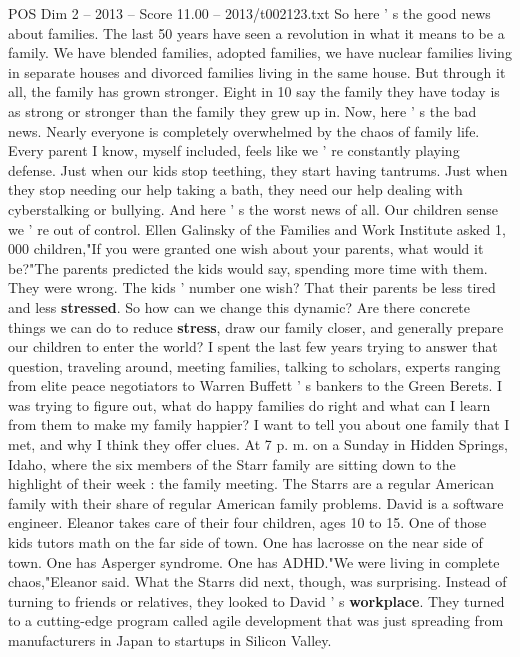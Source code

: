 \begin{textsample}{POS Dim 2 – 2013 – Score 11.00 – 2013/t002123.txt}  \label{ex:f2_pos_069}
So here ' s the good news about families.
The last 50 years have seen a revolution in what it means to be a family.
We have blended families, adopted families, we have nuclear families living in separate houses and divorced families living in the same house.
But through it all, the family has grown stronger.
Eight in 10 say the family they have today is as strong or stronger than the family they grew up in.
Now, here ' s the bad news.
Nearly everyone is completely overwhelmed by the chaos of family life.
Every parent I know, myself included, feels like we ' re constantly playing defense.
Just when our kids stop teething, they start having tantrums.
Just when they stop needing our help taking a bath, they need our help dealing with cyberstalking or bullying.
And here ' s the worst news of all.
Our children sense we ' re out of control.
Ellen Galinsky of the Families and Work Institute asked 1, 000 children,"If you were granted one wish about your parents, what would it be?"The parents predicted the kids would say, spending more time with them.
They were wrong.
The kids ' number one wish?
That their parents be less tired and less \textbf{stressed}.
So how can we change this dynamic?
Are there concrete things we can do to reduce \textbf{stress}, draw our family closer, and generally prepare our children to enter the world?
I spent the last few years trying to answer that question, traveling around, meeting families, talking to scholars, experts ranging from elite peace negotiators to Warren Buffett ' s bankers to the Green Berets.
I was trying to figure out, what do happy families do right and what can I learn from them to make my family happier?
I want to tell you about one family that I met, and why I think they offer clues.
At 7 p. m. on a Sunday in Hidden Springs, Idaho, where the six members of the Starr family are sitting down to the highlight of their week : the family meeting.
The Starrs are a regular American family with their share of regular American family problems.
David is a software engineer.
Eleanor takes care of their four children, ages 10 to 15.
One of those kids tutors math on the far side of town.
One has lacrosse on the near side of town.
One has Asperger syndrome.
One has ADHD."We were living in complete chaos,"Eleanor said.
What the Starrs did next, though, was surprising.
Instead of turning to friends or relatives, they looked to David ' s \textbf{workplace}.
They turned to a cutting-edge program called agile development that was just spreading from manufacturers in Japan to startups in Silicon Valley.

\end{textsample}
